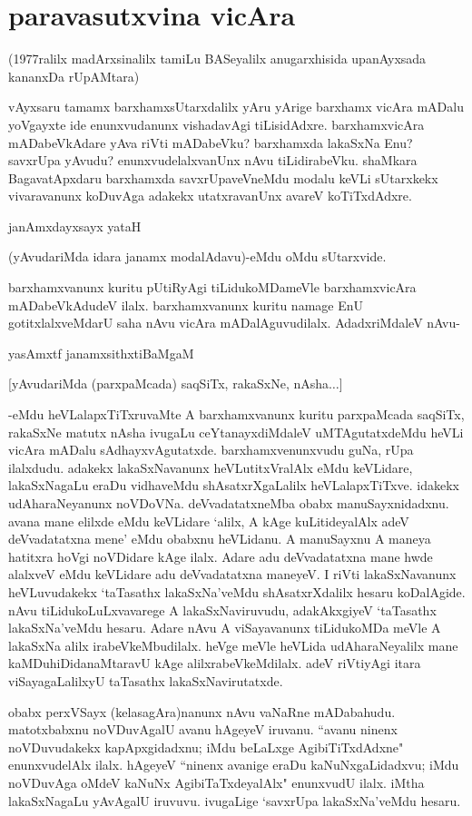 \chapter{paravasutxvina vicAra}\label{chap13}

(1977ralilx madArxsinalilx tamiLu BASeyalilx anugarxhisida upanAyxsada kananxDa rUpAMtara)

vAyxsaru tamamx barxhamxsUtarxdalilx yAru yArige barxhamx vicAra mADalu yoVgayxte ide enunxvudanunx vishadavAgi tiLisidAdxre. barxhamxvicAra mADabeVkAdare yAva riVti mADabeVku? barxhamxda lakaSxNa Enu? savxrUpa yAvudu? enunxvudelalxvanUnx nAvu tiLidirabeVku. shaMkara BagavatApxdaru barxhamxda savxrUpaveVneMdu modalu keVLi sUtarxkekx vivaravanunx koDuvAga adakekx utatxravanUnx avareV koTiTxdAdxre. 

janAmxdayxsayx yataH

(yAvudariMda idara janamx modalAdavu)-eMdu oMdu sUtarxvide. 

barxhamxvanunx kuritu pUtiRyAgi tiLidukoMDameVle barxhamxvicAra mADabeVkAdudeV ilalx. barxhamxvanunx kuritu namage EnU gotitxlalxveMdarU saha nAvu vicAra mADalAguvudilalx. AdadxriMdaleV nAvu- 

yasAmxtf janamxsithxtiBaMgaM

[yAvudariMda (parxpaMcada) saqSiTx, rakaSxNe, nAsha$\ldots$]

-eMdu heVLalapxTiTxruvaMte A barxhamxvanunx kuritu parxpaMcada saqSiTx, rakaSxNe matutx nAsha ivugaLu ceYtanayxdiMdaleV uMTAgutatxdeMdu heVLi vicAra mADalu sAdhayxvAgutatxde. barxhamxvenunxvudu guNa, rUpa ilalxdudu. adakekx lakaSxNavanunx heVLutitxVralAlx eMdu keVLidare, lakaSxNagaLu eraDu vidhaveMdu shAsatxrXgaLalilx heVLalapxTiTxve. idakekx udAharaNeyanunx noVDoVNa. deVvadatatxneMba obabx manuSayxnidadxnu. avana mane elilxde eMdu keVLidare `alilx, A kAge kuLitideyalAlx adeV deVvadatatxna mene' eMdu obabxnu heVLidanu. A manuSayxnu A maneya hatitxra hoVgi noVDidare kAge ilalx. Adare adu deVvadatatxna mane hwde alalxveV eMdu keVLidare adu deVvadatatxna maneyeV. I riVti lakaSxNavanunx heVLuvudakekx `taTasathx lakaSxNa'veMdu shAsatxrXdalilx hesaru koDalAgide. nAvu tiLidukoLuLxvavarege A lakaSxNaviruvudu, adakAkxgiyeV `taTasathx lakaSxNa'veMdu hesaru. Adare nAvu A viSayavanunx tiLidukoMDa meVle A lakaSxNa alilx irabeVkeMbudilalx. heVge meVle heVLida udAharaNeyalilx mane kaMDuhiDidanaMtaravU kAge alilxrabeVkeMdilalx. adeV riVtiyAgi itara viSayagaLalilxyU taTasathx lakaSxNavirutatxde. 

obabx perxVSayx (kelasagAra)nanunx nAvu vaNaRne mADabahudu. matotxbabxnu noVDuvAgalU avanu hAgeyeV iruvanu. ``avanu ninenx noVDuvudakekx kapApxgidadxnu; iMdu beLaLxge AgibiTiTxdAdxne" enunxvudelAlx ilalx. hAgeyeV ``ninenx avanige eraDu kaNuNxgaLidadxvu; iMdu noVDuvAga oMdeV kaNuNx AgibiTaTxdeyalAlx" enunxvudU ilalx. iMtha lakaSxNagaLu yAvAgalU iruvuvu. ivugaLige `savxrUpa lakaSxNa'veMdu hesaru.

